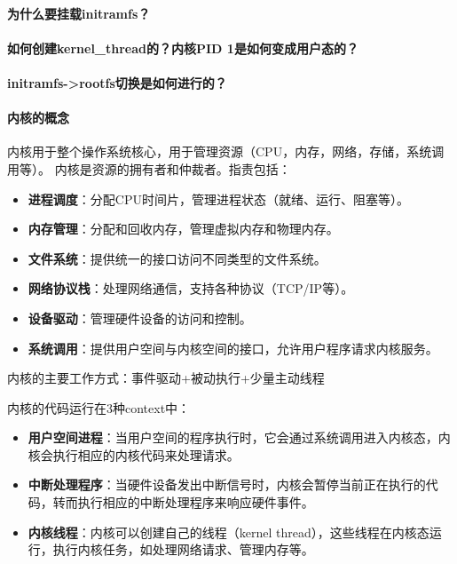 \paragraph{为什么要挂载initramfs？}

\paragraph{如何创建kernel\_thread的？内核PID 1是如何变成用户态的？}

\paragraph{initramfs->rootfs切换是如何进行的？}





\paragraph{内核的概念}
内核用于整个操作系统核心，用于管理资源（CPU，内存，网络，存储，系统调用等）。
内核是资源的拥有者和仲裁者。指责包括：
\begin{itemize}
    \item \textbf{进程调度}：分配CPU时间片，管理进程状态（就绪、运行、阻塞等）。
    \item \textbf{内存管理}：分配和回收内存，管理虚拟内存和物理内存。
    \item \textbf{文件系统}：提供统一的接口访问不同类型的文件系统。
    \item \textbf{网络协议栈}：处理网络通信，支持各种协议（TCP/IP等）。
    \item \textbf{设备驱动}：管理硬件设备的访问和控制。
    \item \textbf{系统调用}：提供用户空间与内核空间的接口，允许用户程序请求内核服务。
\end{itemize}

内核的主要工作方式：事件驱动+被动执行+少量主动线程

内核的代码运行在3种context中：
\begin{itemize}
    \item \textbf{用户空间进程}：当用户空间的程序执行时，它会通过系统调用进入内核态，内核会执行相应的内核代码来处理请求。
    \item \textbf{中断处理程序}：当硬件设备发出中断信号时，内核会暂停当前正在执行的代码，转而执行相应的中断处理程序来响应硬件事件。
    \item \textbf{内核线程}：内核可以创建自己的线程（kernel thread），这些线程在内核态运行，执行内核任务，如处理网络请求、管理内存等。
\end{itemize}


